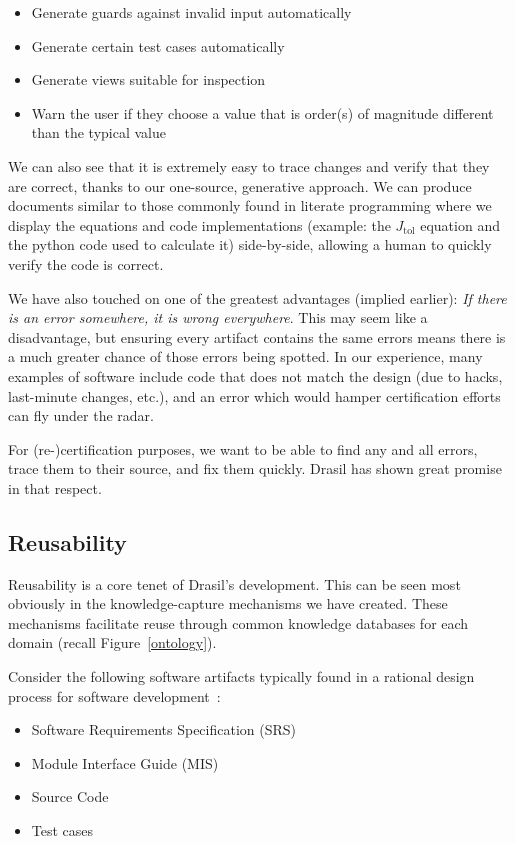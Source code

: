 \documentclass[sigconf]{acmart}
\newcommand{\jtol}{$J_{\mbox{tol}}$}
\begin{document}
{\begin{itemize}
\item Generate guards against invalid input automatically
\item Generate certain test cases automatically
\item Generate views suitable for inspection
\item Warn the user if they choose a value that is order(s) of magnitude different than 
the typical value
\end{itemize}
We can also see that it is extremely easy to trace changes and verify that they 
are correct, thanks to our one-source, generative approach. We can produce 
documents similar to those commonly found in literate programming where we 
display the equations and code implementations (example: the \jtol{} equation 
and the python code used to calculate it) side-by-side, allowing a human to 
quickly verify the code is correct.

We have also touched on one of the greatest advantages (implied 
earlier): \emph{If there is an error somewhere, it is wrong everywhere}. This 
may seem like a disadvantage, but ensuring every artifact contains the same 
errors means there is a much greater chance of those errors being spotted. In 
our experience, many examples of software include code that does not match the 
design (due to hacks, last-minute changes, etc.), and an error which would 
hamper certification efforts can fly under the radar. 

For (re-)certification purposes, we want to be able to find any and all errors, 
trace them to their source, and fix them quickly. Drasil has shown great 
promise in that respect.

\subsection{Reusability}

Reusability is a core tenet of Drasil's development. This can be seen 
most obviously in the knowledge-capture mechanisms we have created. These 
mechanisms facilitate reuse through common knowledge databases for each domain 
(recall Figure~\ref{ontology}).

Consider the following software artifacts typically found in a rational design 
process for software development~\cite{ParnasAndClements1986}:

\begin{itemize}
\item Software Requirements Specification (SRS)
\item Module Interface Guide (MIS)
\item Source Code
\item Test cases
\end{itemize}

}
\end{document}
